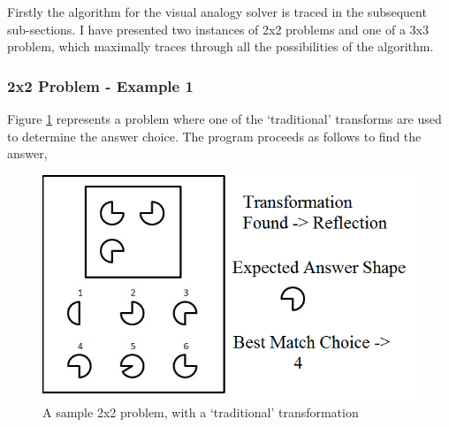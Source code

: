 \documentclass[10pt, letter]{article}
\begin{document}
Firstly the algorithm for the visual analogy solver is traced in the subsequent sub-sections. I have presented two instances of 2x2 problems and one of a 3x3 problem, which maximally traces through all the possibilities of the algorithm.
\subsubsection*{2x2 Problem - Example 1}
Figure \ref{fig9} represents a problem where one of the `traditional' transforms are used to determine the answer choice. The program proceeds as follows to find the answer,
\begin{figure}[h!]
  \centering
    \includegraphics[scale = 0.5]{Images/Fig9}
    \caption{A sample 2x2 problem, with a `traditional' transformation}
  \label{fig9}
\end{figure}
\end{document}
